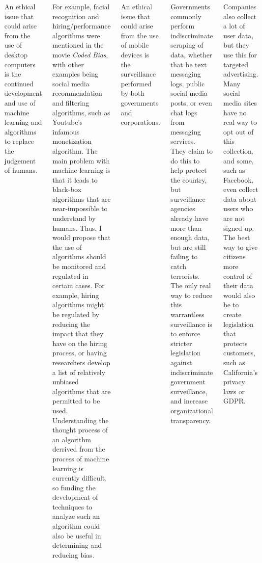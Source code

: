 \documentclass[a1paper, 25pt]{tikzposter}
\begin{document}
\begin{columns}
   {
    An ethical issue that could arise from the use of desktop computers is the continued development and use of machine learning and algorithms to replace the judgement of humans.

    For example, facial recognition and hiring/performance algorithms were mentioned in the movie \textit{Coded Bias}, with other examples being social media recommendation and filtering algorithms, such as Youtube's infamous monetization algorithm. The main problem with machine learning is that it leads to black-box algorithms that are near-impossible to understand by humans. Thus, I would propose that the use of algorithms should be monitored and regulated in certain cases. For example, hiring algorithms might be regulated by reducing the impact that they have on the hiring process, or having researchers develop a list of relatively unbiased algorithms that are permitted to be used. Understanding the thought process of an algorithm derrived from the process of machine learning is currently difficult, so funding the development of techniques to analyze such an algorithm could also be useful in determining and reducing bias.
  }
   {
    An ethical issue that could arise from the use of mobile devices is the surveillance performed by both governments and corporations.
    
    Governments commonly perform indiscriminate scraping of data, whether that be text messaging logs, public social media posts, or even chat logs from messaging services. They claim to do this to help protect the country, but surveillance agencies already have more than enough data, but are still failing to catch terrorists. The only real way to reduce this warrantless surveillance is to enforce stricter legislation against indiscriminate government surveillance, and increase organizational transparency.

    Companies also collect a lot of user data, but they use this for targeted advertising. Many social media sites have no real way to opt out of this collection, and some, such as Facebook, even collect data about users who are not signed up. The best way to give citizens more control of their data would also be to create legislation that protects customers, such as California's privacy laws or GDPR.
  }
\end{columns}
\end{document}
